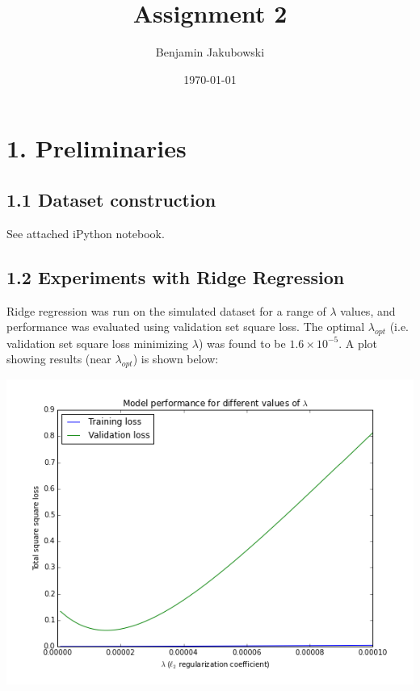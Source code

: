 \documentclass[paper=a4, fontsize=11pt]{scrartcl} %
\title{	Assignment 2}
\author{Benjamin Jakubowski} %
\date{\normalsize\today} %
\numberwithin{equation}{section} %
\numberwithin{figure}{section} %
\numberwithin{table}{section} %
\begin{document}
\maketitle %


\section*{1. Preliminaries}
\subsection*{1.1 Dataset construction}

See attached iPython notebook.


\subsection*{1.2 Experiments with Ridge Regression}

Ridge regression was run on the simulated dataset for a range of $\lambda$ values, and performance was evaluated using validation set square loss. The optimal $\lambda_{opt}$ (i.e. validation set square loss minimizing $\lambda$) was found to be $1.6 \times 10^{-5}$. A plot showing results (near $\lambda_{opt}$) is shown below:
\begin{center} \includegraphics[scale=0.65]{./../figures/1_2_1.png} \end{center}
\end{document}
